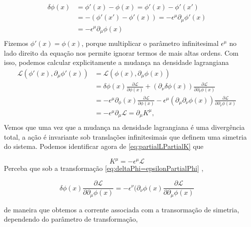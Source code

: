 \begin{equation}
\begin{aligned}
\delta \phi(x) &= \phi'(x) - \phi(x) = \phi'(x) - \phi'(x') \\
&= -(\phi'(x') - \phi'(x)) = - \epsilon^\mu \partial_\mu \phi'(x) \\ 
&= - \epsilon^\mu \partial_\mu \phi(x) \\ \label{eq:deltaPhi=epsilonPartialPhi}
\end{aligned}
\end{equation} 
Fizemos $\phi'(x)=\phi(x)$, porque multiplicar o parâmetro infinitesimal $\epsilon^\mu$ no lado direito da equação nos permite ignorar termos de mais altas ordens. Com isso, podemos calcular explicitamente a mudança na densidade lagrangiana
\begin{equation}
\begin{aligned}
\mathcal{L} (\phi'(x), \partial_\mu \phi'(x)) &= \mathcal{L} (\phi(x), \partial_\mu \phi(x)) \\
&= \delta \phi(x) \frac{\partial \mathcal{L}}{\partial \phi(x)} + (\partial_\nu \delta \phi(x)) \frac{\partial \mathcal{L}}{\partial \partial_\nu \phi(x)} \\
&= -\epsilon^\mu \partial_ \phi(x) \frac{\partial \mathcal{L}}{\partial \phi(x)} -\epsilon^\mu (\partial_\mu \partial_\nu \phi(x)) \frac{\partial \mathcal{L}}{\partial \partial_\nu \phi(x)} \\
&= -\epsilon^\mu \partial_\mu \mathcal{L} = \partial_\mu K^\mu , \\ \label{eq:partialLPartialK}
\end{aligned}
\end{equation}
Vemos que uma vez que a mudança na densidade lagrangiana é uma divergência total, a ação é invariante sob translações infinitesimais que definem uma simetria do sistema. Podemos identificar agora de \eqref{eq:partialLPartialK} que 

\begin{equation}
K^\mu = -\epsilon^\mu \mathcal{L} 
\end{equation}
Perceba que sob a transformação \eqref{eq:deltaPhi=epsilonPartialPhi} ,

\begin{equation}
\delta \phi (x) \frac{\partial \mathcal{L}}{\partial \partial_\mu \phi (x)  } = -\epsilon^\nu (\partial_\nu \phi(x) \frac{\partial \mathcal{L}}{\partial \partial_\mu \phi (x)  }
\end{equation}

de maneira que obtemos a corrente associada com a transormação de simetria, dependendo do parâmetro de transformação,

